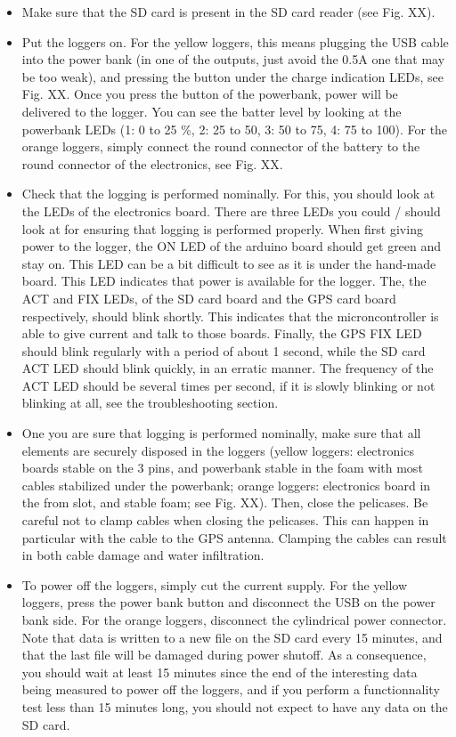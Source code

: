 \documentclass[pdftex,a4paper,12pt,twocolumn,fleqn,captions=tableheading]{scrartcl}
\begin{document}
\begin{itemize}
  \item Make sure that the SD card is present in the SD card reader (see Fig. XX).

  \item Put the loggers on. For the yellow loggers, this means plugging the USB cable into the power bank (in one of the outputs, just avoid the 0.5A one that may be too weak), and pressing the button under the charge indication LEDs, see Fig. XX. Once you press the button of the powerbank, power will be delivered to the logger. You can see the batter level by looking at the powerbank LEDs (1: 0 to 25 \%, 2: 25 to 50, 3: 50 to 75, 4: 75 to 100). For the orange loggers, simply connect the round connector of the battery to the round connector of the electronics, see Fig. XX.

  \item Check that the logging is performed nominally. For this, you should look at the LEDs of the electronics board. There are three LEDs you could / should look at for ensuring that logging is performed properly. When first giving power to the logger, the ON LED of the arduino board should get green and stay on. This LED can be a bit difficult to see as it is under the hand-made board. This LED indicates that power is available for the logger. The, the ACT and FIX LEDs, of the SD card board and the GPS card board respectively, should blink shortly. This indicates that the microncontroller is able to give current and talk to those boards. Finally, the GPS FIX LED should blink regularly with a period of about 1 second, while the SD card ACT LED should blink quickly, in an erratic manner. The frequency of the ACT LED should be several times per second, if it is slowly blinking or not blinking at all, see the troubleshooting section.

  \item One you are sure that logging is performed nominally, make sure that all elements are securely disposed in the loggers (yellow loggers: electronics boards stable on the 3 pins, and powerbank stable in the foam with most cables stabilized under the powerbank; orange loggers: electronics board in the from slot, and stable foam; see Fig. XX). Then, close the pelicases. Be careful not to clamp cables when closing the pelicases. This can happen in particular with the cable to the GPS antenna. Clamping the cables can result in both cable damage and water infiltration.

  \item To power off the loggers, simply cut the current supply. For the yellow loggers, press the power bank button and disconnect the USB on the power bank side. For the orange loggers, disconnect the cylindrical power connector. Note that data is written to a new file on the SD card every 15 minutes, and that the last file will be damaged during power shutoff. As a consequence, you should wait at least 15 minutes since the end of the interesting data being measured to power off the loggers, and if you perform a functionnality test less than 15 minutes long, you should not expect to have any data on the SD card.

\end{itemize}
\end{document}
